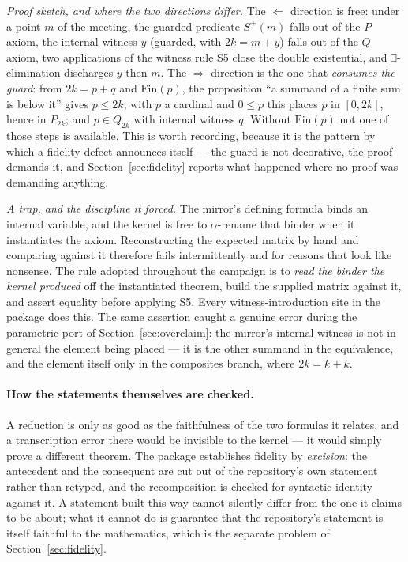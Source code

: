\documentclass[11pt]{article}
\theoremstyle{remark}\newtheorem{remark}{Remark}
\begin{document}
\emph{Proof sketch, and where the two directions differ.} The $\Leftarrow$ direction is
free: under a point $m$ of the meeting, the guarded predicate $S^{+}(m)$ falls out of
the $P$ axiom, the internal witness $y$ (guarded, with $2k = m + y$) falls out of the
$Q$ axiom, two applications of the witness rule S5 close the double existential, and
$\exists$-elimination discharges $y$ then $m$. The $\Rightarrow$ direction is the one
that \emph{consumes the guard}: from $2k = p + q$ and $\mathrm{Fin}(p)$, the
proposition ``a summand of a finite sum is below it'' gives $p \le 2k$; with $p$ a
cardinal and $0 \le p$ this places $p$ in $[0, 2k]$, hence in $P_{2k}$; and $p \in
Q_{2k}$ with internal witness $q$. Without $\mathrm{Fin}(p)$ not one of those steps is
available. This is worth recording, because it is the pattern by which a fidelity
defect announces itself --- the guard is not decorative, the proof demands it, and
Section~\ref{sec:fidelity} reports what happened where no proof was demanding anything.

\emph{A trap, and the discipline it forced.} The mirror's defining formula binds an
internal variable, and the kernel is free to $\alpha$-rename that binder when it
instantiates the axiom. Reconstructing the expected matrix by hand and comparing
against it therefore fails intermittently and for reasons that look like nonsense. The
rule adopted throughout the campaign is to \emph{read the binder the kernel produced}
off the instantiated theorem, build the supplied matrix against it, and assert equality
before applying S5. Every witness-introduction site in the package does this. The same
assertion caught a genuine error during the parametric port of
Section~\ref{sec:overclaim}: the mirror's internal witness is not in general the
element being placed --- it is the other summand in the equivalence, and the element
itself only in the composites branch, where $2k = k + k$.

\paragraph{How the statements themselves are checked.} A reduction is only as good as
the faithfulness of the two formulas it relates, and a transcription error there would
be invisible to the kernel --- it would simply prove a different theorem. The package
establishes fidelity by \emph{excision}: the antecedent and the consequent are cut out
of the repository's own statement rather than retyped, and the recomposition is checked
for syntactic identity against it. A statement built this way cannot silently differ
from the one it claims to be about; what it cannot do is guarantee that the
repository's statement is itself faithful to the mathematics, which is the separate
problem of Section~\ref{sec:fidelity}.
\end{document}
